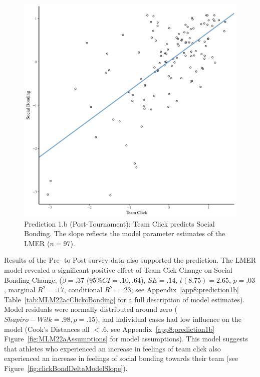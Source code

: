 \begin{CJK}{UTF8}{gbsn}
  \begin{figure}[htbp]
    \centering
  \includegraphics[scale=.5]{images/clickBondModelSlope.pdf}
    \caption{Prediction 1.b (Post-Tournament): Team Click predicts Social Bonding. The slope reflects the model parameter estimates of the LMER ($n = 97$).}
    \label{fig:clickBondModelSlope}
  \end{figure}



Results of the Pre- to Post survey data also supported the prediction.
The LMER model revealed a significant positive effect of Team Cick Change on Social Bonding Change, ($\beta = .37$ ($95\% CI =  .10, .64$), $SE = .14$, $t(8.75) = 2.65$, $p = .03$, marginal $R^2 = .17$, conditional $R^2 = .23$; see Appendix~\ref{app8:prediction1b} Table~\ref{tab:MLM22acClickcBonding} for a full description of model estimates).  Model residuals were normally distributed around zero ($Shapiro-Wilk = .98, p = .15$). and individual cases had low influence on the model (Cook's Distances all $< .6$, see Appendix~\ref{app8:prediction1b} Figure~\ref{fig:MLM22aAssumptions} for model assumptions).  This model suggests that athletes who experienced an increase in feelings of team click also experienced an increase in feelings of social bonding towards their team (see Figure~\ref{fig:clickBondDeltaModelSlope}).



\end{CJK}
